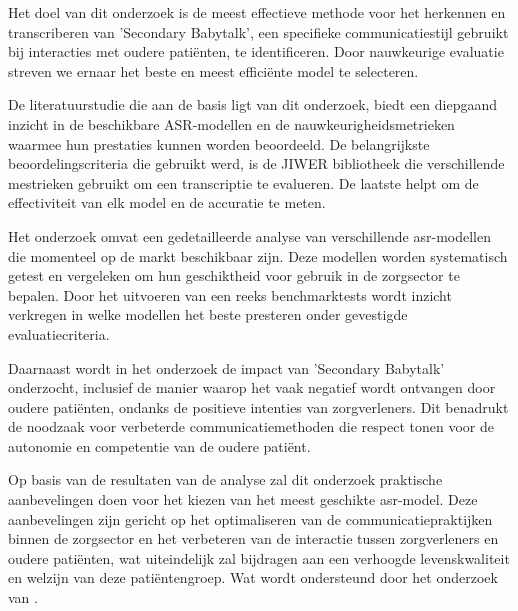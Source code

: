 Het doel van dit onderzoek is de meest effectieve methode voor het herkennen en transcriberen van 'Secondary Babytalk', een specifieke communicatiestijl gebruikt bij interacties met oudere patiënten, te identificeren. Door nauwkeurige evaluatie streven we ernaar het beste en meest efficiënte model te selecteren.

De literatuurstudie die aan de basis ligt van dit onderzoek, biedt een diepgaand inzicht in de beschikbare ASR-modellen en de nauwkeurigheidsmetrieken waarmee hun prestaties kunnen worden beoordeeld. De belangrijkste beoordelingscriteria die gebruikt werd, is de JIWER bibliotheek die verschillende mestrieken gebruikt om een transcriptie te evalueren. De laatste helpt om de effectiviteit van elk model en de accuratie te meten.

Het onderzoek omvat een gedetailleerde analyse van verschillende \gls{asr}-modellen die momenteel op de markt beschikbaar zijn. Deze modellen worden systematisch getest en vergeleken om hun geschiktheid voor gebruik in de zorgsector te bepalen. Door het uitvoeren van een reeks benchmarktests wordt inzicht verkregen in welke modellen het beste presteren onder gevestigde evaluatiecriteria.

Daarnaast wordt in het onderzoek de impact van 'Secondary Babytalk' onderzocht, inclusief de manier waarop het vaak negatief wordt ontvangen door oudere patiënten, ondanks de positieve intenties van zorgverleners. Dit benadrukt de noodzaak voor verbeterde communicatiemethoden die respect tonen voor de autonomie en competentie van de oudere patiënt.

Op basis van de resultaten van de analyse zal dit onderzoek praktische aanbevelingen doen voor het kiezen van het meest geschikte \gls{asr}-model. Deze aanbevelingen zijn gericht op het optimaliseren van de communicatiepraktijken binnen de zorgsector en het verbeteren van de interactie tussen zorgverleners en oudere patiënten, wat uiteindelijk zal bijdragen aan een verhoogde levenskwaliteit en welzijn van deze patiëntengroep. Wat wordt ondersteund door het onderzoek van \textcite{Sibian2024}.
